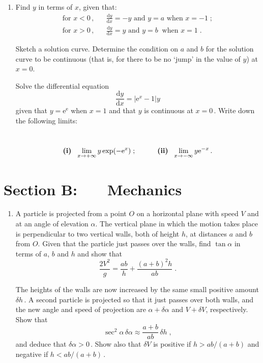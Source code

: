\documentclass[a4, 11pt]{report}
\newlength{\qspace}
\newcounter{qnumber}
\newenvironment{question}%
 {\vspace{\qspace}
  \begin{enumerate}[\bfseries 1\quad][10]%
    \setcounter{enumi}{\value{qnumber}}%
    \item%
 }
{
  \end{enumerate}
  \filbreak
  \stepcounter{qnumber}
 }
\def\d{{\mathrm d}}
\def\e{{\mathrm e}}
\begin{document}
\begin{question}	
Find $y$ in terms of $x$, given that:
\begin{eqnarray*}
    \mbox{for $x < 0\,$}, && \frac{\d y}{\d x} = -y \mbox{ \ \ and \ \ } 
y = a \mbox{ when } x = -1\;;
\\
    \mbox{for $x > 0\,$}, && \frac{\d y}{\d x} = y \mbox{ \ \  \ \ and \ \ }
y = b  \ \mbox{ when } x = 1\;.
\end{eqnarray*}


Sketch a solution curve.  Determine the condition on $a$ and $b$
for the solution curve  to be continuous (that is,  for there to be no `jump' in the value of 
$y$) at $x = 0$.


Solve the differential equation
\[
             \frac{\d y}{\d x} = \left\vert \e^x-1\right\vert y
\]
given that $y=\e^{\e}$ when $x=1$ and that $y$ is continuous at $x=0\,$.
Write down  the following limits:

\
\[
  \text{\textbf{(i)}} \ \   \lim_ {x \to +\infty} y\exp(-\e^x)\;; 
 \ \ \ \ \ \ \ \ \ 
\text{\textbf{(ii)}} \ \ \lim_{x \to -\infty}y \e^{-x}\,.
\]
\end{question}	
		

		
	
\newpage
\section*{Section B: \ \ \ Mechanics}


	
\begin{question}
 A particle is projected from a point $O$ on a horizontal plane
with speed $V$ and at an angle
of elevation $\alpha$. The vertical plane in which the motion takes place
is perpendicular to two vertical walls, both of height $h$, at distances
$a$ and $b$ from $O$. Given that the particle just passes over the
walls, find $\tan\alpha$ in terms of $a$, $b$ and $h$ and
show that
\[
\frac{2V^2} g = \frac {ab} h +\frac{ (a+b)^2 h}{ab} \;.
\]

The heights of the walls  are now increased  by the same  small positive
amount $\delta h\,$. 
A  second particle is projected so that it just passes over
both walls,  and  the new angle and speed of projection 
are  $\alpha +\delta \alpha $ and $V+\delta V$, respectively.
Show that 
\[
\sec^2 \alpha \, \delta \alpha  \approx \frac {a+b}{ab}\,\delta h \;,
\]
and deduce that $\delta \alpha >0\,$. Show also that 
$\delta V$ is positive if $h> ab/(a+b)$ and negative if $h<ab/(a+b)\,$.
	\end{question}
	
\end{document}
